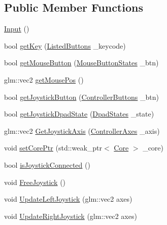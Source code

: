 \subsection*{Public Member Functions}
\begin{DoxyCompactItemize}
\item 
\hyperlink{classfrontier_1_1_input_a42044ec5fabe49b52de3437eac14dab0}{Input} ()
\item 
bool \hyperlink{classfrontier_1_1_input_a9db590e5a79e86162f930f9d80cd70a3}{get\+Key} (\hyperlink{classfrontier_1_1_input_ada5b6b09af9c827bacee6fbc69015096}{Listed\+Buttons} \+\_\+keycode)
\item 
bool \hyperlink{classfrontier_1_1_input_ab0f4c13a20e12f8679666fb6e4f4ccaf}{get\+Mouse\+Button} (\hyperlink{classfrontier_1_1_input_ae78744e8c0799230bc6533be5d4b40f7}{Mouse\+Button\+States} \+\_\+btn)
\item 
glm\+::vec2 \hyperlink{classfrontier_1_1_input_ac3330b7e20d086eb7b9da283dec779dc}{get\+Mouse\+Pos} ()
\item 
bool \hyperlink{classfrontier_1_1_input_ac4204ad7ae1c395c26c8a5d397e99532}{get\+Joystick\+Button} (\hyperlink{classfrontier_1_1_input_affa0331a173268233d6630184a105bb6}{Controller\+Buttons} \+\_\+btn)
\item 
bool \hyperlink{classfrontier_1_1_input_a8a4efb296d3f78e8eea6064da50af43b}{get\+Joystick\+Dpad\+State} (\hyperlink{classfrontier_1_1_input_a53a85fe24f5b35e1a42ab370dcd0d94e}{Dpad\+States} \+\_\+state)
\item 
glm\+::vec2 \hyperlink{classfrontier_1_1_input_a60c4086a12484369d9e96c065b5cce52}{Get\+Joystick\+Axis} (\hyperlink{classfrontier_1_1_input_aa34e103eba0f13faf437863692310859}{Controller\+Axes} \+\_\+axis)
\item 
void \hyperlink{classfrontier_1_1_input_ab3326fdae63e71c2d6c7e5bc8dad167c}{set\+Core\+Ptr} (std\+::weak\+\_\+ptr$<$ \hyperlink{classfrontier_1_1_core}{Core} $>$ \+\_\+core)
\item 
bool \hyperlink{classfrontier_1_1_input_ac05050b8aef9b669840c69868c157019}{is\+Joystick\+Connected} ()
\item 
void \hyperlink{classfrontier_1_1_input_a93acada680176426a09bd5cc4606fe6c}{Free\+Joystick} ()
\item 
void \hyperlink{classfrontier_1_1_input_ace92d811ccd65b1cccc8be927c840720}{Update\+Left\+Joystick} (glm\+::vec2 axes)
\item 
void \hyperlink{classfrontier_1_1_input_a19763242a418ba60581b767eb4c40b78}{Update\+Right\+Joystick} (glm\+::vec2 axes)

\end{DoxyCompactItemize}
